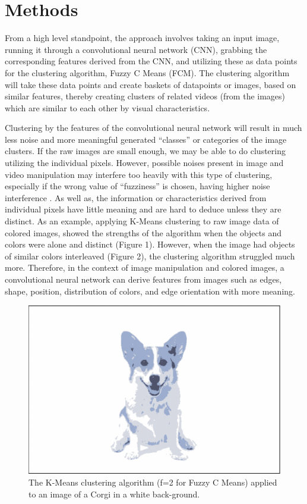 \documentclass[10pt,twocolumn]{article}
\begin{document}
\section {Methods}

From a high level standpoint, the approach involves taking an input image, running it through a convolutional neural network (CNN), grabbing the corresponding features derived from the CNN, and utilizing these as data points for the clustering algorithm, Fuzzy C Means (FCM). The clustering algorithm will take these data points and create baskets of datapoints or images, based on similar features, thereby creating clusters of related videos (from the images) which are similar to each other by visual characteristics. 

Clustering by the features of the convolutional neural network will result in much less noise and more meaningful generated “classes” or categories of the image clusters. If the raw images are small enough, we may be able to do clustering utilizing the individual pixels. However, possible noises present in image and video manipulation may interfere too heavily with this type of clustering, especially if the wrong value of “fuzziness” is chosen, having higher noise interference \cite{Zhang2019}. As well as, the information or characteristics derived from individual pixels have little meaning and are hard to deduce unless they are distinct. As an example, applying K-Means clustering to raw image data of colored images, showed the strengths of the algorithm when the objects and colors were alone and distinct (Figure 1). However, when the image had objects of similar colors interleaved (Figure 2), the clustering algorithm struggled much more. Therefore, in the context of image manipulation and colored images, a convolutional neural network can derive features from images such as edges, shape, position, distribution of colors, and edge orientation \cite{Lavrenko2014} with more meaning.

\begin{figure}[h]
 \centering
 \includegraphics[scale=0.2]{corgi-white.png}
 \vspace{20px}
 \caption{The K-Means clustering algorithm (f=2 for Fuzzy C Means) applied to an image of a Corgi in a white back-ground.}
 \label{corgi:white}
\end{figure}
\end{document}
